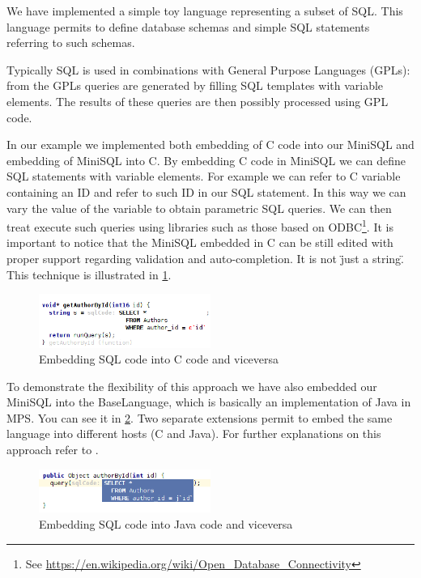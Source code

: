 \documentclass[preprint,numbers,10pt]{sigplanconf}
\begin{document}
We have implemented a simple toy language representing a subset of SQL. This language permits to define database schemas and simple SQL statements referring to such schemas.

Typically SQL is used in combinations with General Purpose Languages (GPLs): from the GPLs queries are generated by filling SQL templates with variable elements. The results of these queries are then possibly processed using GPL code.

In our example we implemented both embedding of C code into our MiniSQL and embedding of MiniSQL into C.
By embedding C code in MiniSQL we can define SQL statements with variable elements. For example we can refer to C variable containing an ID and refer to such ID in our SQL statement. In this way we can vary the value of the variable to obtain parametric SQL queries. We can then treat execute such queries using libraries such as those based on ODBC\footnote{See \url{https://en.wikipedia.org/wiki/Open_Database_Connectivity}}. It is important to notice that the MiniSQL embedded in C can be still edited with proper support regarding validation and auto-completion. It is not \"just a string\".
This technique is illustrated in \ref{fig:sqlembedding}.

\begin{figure}[p]
	\centering
	\includegraphics[width=0.50\textwidth]{screens/minisql_embedded.png}
	\caption{Embedding SQL code into C code and viceversa}
	\label{fig:sqlembedding}
\end{figure}

To demonstrate the flexibility of this approach we have also embedded our MiniSQL into the BaseLanguage, which is basically an implementation of Java in MPS. You can see it in \ref{fig:sqlembeddingjava}. Two separate extensions permit to embed the same language into different hosts (C and Java). For further explanations on this approach refer to \cite{Tomassetti2013}.

\begin{figure}[p]
	\centering
	\includegraphics[width=0.50\textwidth]{screens/minisql_embedded_java.png}
	\caption{Embedding SQL code into Java code and viceversa}
	\label{fig:sqlembeddingjava}
\end{figure}
\end{document}
